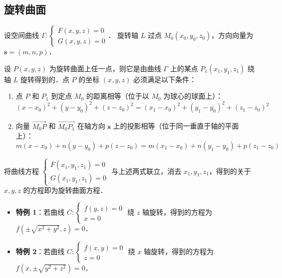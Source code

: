 \documentclass[12pt, a4paper, oneside, UTF8]{ctexbook}
\begin{document}
\subsection{旋转曲面}
\begin{theorem}[任意曲线绕任意轴旋转的曲面方程]
    设空间曲线 $\Gamma: \begin{cases} F(x, y, z) = 0 \\ G(x, y, z) = 0 \end{cases}$．
    旋转轴 $L$ 过点 $M_0(x_0, y_0, z_0)$，方向向量为 $\boldsymbol{s} = (m, n, p)$．

    设 $P(x, y, z)$ 为旋转曲面上任一点，则它是由曲线 $\Gamma$ 上的某点 $P_1(x_1, y_1, z_1)$ 绕轴 $L$ 旋转得到的．点 $P$ 的坐标 $(x, y, z)$ 必须满足以下条件：
    \begin{enumerate}
        \item 点 $P$ 和 $P_1$ 到定点 $M_0$ 的距离相等（位于以 $M_0$ 为球心的球面上）：
        \[ (x-x_0)^2 + (y-y_0)^2 + (z-z_0)^2 = (x_1-x_0)^2 + (y_1-y_0)^2 + (z_1-z_0)^2 \]
        \item 向量 $\overrightarrow{M_0P}$ 和 $\overrightarrow{M_0P_1}$ 在轴方向 $\boldsymbol{s}$ 上的投影相等（位于同一垂直于轴的平面上）：
        \[ m(x-x_0) + n(y-y_0) + p(z-z_0) = m(x_1-x_0) + n(y_1-y_0) + p(z_1-z_0) \]
    \end{enumerate}
    将曲线方程 $\begin{cases} F(x_1, y_1, z_1) = 0 \\ G(x_1, y_1, z_1) = 0 \end{cases}$ 与上述两式联立，消去 $x_1, y_1, z_1$，得到的关于 $x, y, z$ 的方程即为旋转曲面方程．
\end{theorem}

\begin{itemize}
    \item \textbf{特例 1}：若曲线 $C:\begin{cases} f(y,z)=0 \\ x=0 \end{cases}$ 绕 $z$ 轴旋转，得到的方程为 $f(\pm\sqrt{x^2+y^2}, z) = 0$．
    \item \textbf{特例 2}：若曲线 $C:\begin{cases} f(x,y)=0 \\ z=0 \end{cases}$ 绕 $x$ 轴旋转，得到的方程为 $f(x, \pm\sqrt{y^2+z^2}) = 0$．
\end{itemize}
\end{document}
